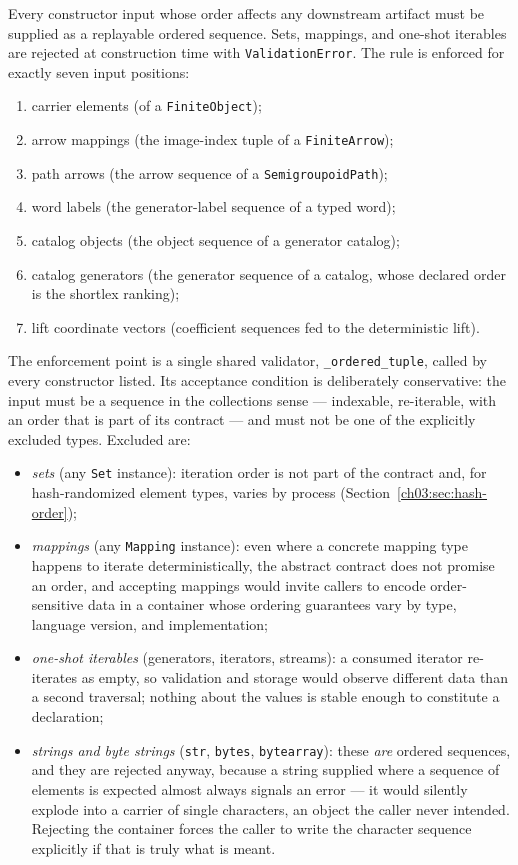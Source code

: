 \begin{ruleenv}\label{ch03:rule:ordered-input}
Every constructor input whose order affects any downstream artifact must be
supplied as a replayable ordered sequence. Sets, mappings, and one-shot
iterables are rejected at construction time with \texttt{ValidationError}.
The rule is enforced for exactly seven input positions:
\begin{enumerate}
\item carrier elements (of a \texttt{FiniteObject});
\item arrow mappings (the image-index tuple of a \texttt{FiniteArrow});
\item path arrows (the arrow sequence of a \texttt{SemigroupoidPath});
\item word labels (the generator-label sequence of a typed word);
\item catalog objects (the object sequence of a generator catalog);
\item catalog generators (the generator sequence of a catalog, whose
declared order is the shortlex ranking);
\item lift coordinate vectors (coefficient sequences fed to the
deterministic lift).
\end{enumerate}
\end{ruleenv}

The enforcement point is a single shared validator,
\texttt{\_ordered\_tuple}, called by every constructor listed. Its
acceptance condition is deliberately conservative: the input must be a
sequence in the collections sense --- indexable, re-iterable, with an
order that is part of its contract --- and must not be one of the
explicitly excluded types. Excluded are:

\begin{itemize}
\item \emph{sets} (any \texttt{Set} instance): iteration order is not part
of the contract and, for hash-randomized element types, varies by process
(Section~\ref{ch03:sec:hash-order});
\item \emph{mappings} (any \texttt{Mapping} instance): even where a
concrete mapping type happens to iterate deterministically, the abstract
contract does not promise an order, and accepting mappings would invite
callers to encode order-sensitive data in a container whose ordering
guarantees vary by type, language version, and implementation;
\item \emph{one-shot iterables} (generators, iterators, streams): a
consumed iterator re-iterates as empty, so validation and storage would
observe different data than a second traversal; nothing about the values
is stable enough to constitute a declaration;
\item \emph{strings and byte strings} (\texttt{str}, \texttt{bytes},
\texttt{bytearray}): these \emph{are} ordered sequences, and they are
rejected anyway, because a string supplied where a sequence of elements is
expected almost always signals an error --- it would silently explode into
a carrier of single characters, an object the caller never intended.
Rejecting the container forces the caller to write the character sequence
explicitly if that is truly what is meant.
\end{itemize}

